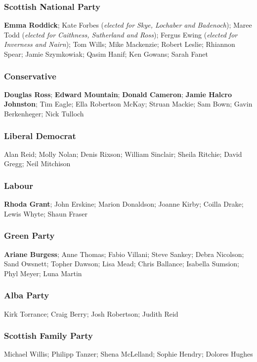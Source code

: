 \begin{resultsiii}
	\subsubsection*{Scottish National Party}
	\textbf{Emma Roddick}; Kate Forbes (\emph{elected for Skye, Lochaber and Badenoch}); Maree Todd (\emph{elected for Caithness, Sutherland and Ross}); Fergus Ewing (\emph{elected for Inverness and Nairn}); Tom Wills; Mike Mackenzie; Robert Leslie; Rhiannon Spear; Jamie Szymkowiak; Qasim Hanif; Ken Gowans; Sarah Fanet
	
	\subsubsection*{Conservative}
	\textbf{Douglas Ross}; \textbf{Edward Mountain}; \textbf{Donald Cameron}; \textbf{Jamie Halcro Johnston}; Tim Eagle; Ella Robertson McKay; Struan Mackie; Sam Bown; Gavin Berkenheger; Nick Tulloch
	
	\subsubsection*{Liberal Democrat}
	Alan Reid; Molly Nolan; Denis Rixson; William Sinclair; Sheila Ritchie; David Gregg; Neil Mitchison

	\subsubsection*{Labour}
	\textbf{Rhoda Grant}; John Erskine; Marion Donaldson; Joanne Kirby; Coilla Drake; Lewis Whyte; Shaun Fraser
	
	\subsubsection*{Green Party}
	\textbf{Ariane Burgess}; Anne Thomas; Fabio Villani; Steve Sankey; Debra Nicolson; Sand Owsnett; Topher Dawson; Lisa Mead; Chris Ballance; Isabella Sumsion; Phyl Meyer; Luna Martin
	
	\subsubsection*{Alba Party}
	Kirk Torrance; Craig Berry; Josh Robertson; Judith Reid
	
	\subsubsection*{Scottish Family Party}
	Michael Willis; Philipp Tanzer; Shena McLelland; Sophie Hendry; Dolores Hughes
	

\end{resultsiii}
